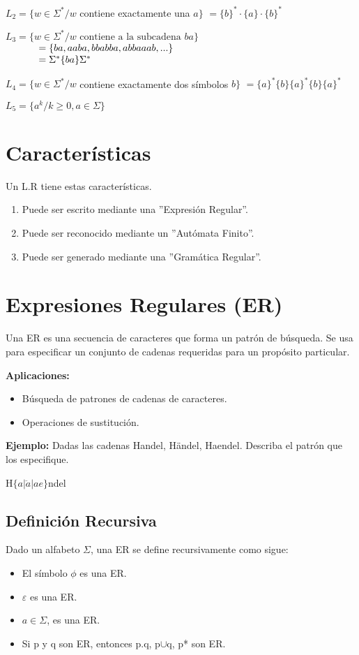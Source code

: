 $L_2=\{ w\in \Sigma^* / w$ contiene exactamente una $a\}$ $=\{b\}^* \cdot\{a\} \cdot\{ b\}^*$

$L_3=\{ w\in \Sigma^* / w \mbox{ contiene a la subcadena } ba\}$ \\
$\begin{array}{p{0.65cm}l}
   &=\{ ba,aaba,bbabba,abbaaab,...\} \\
   &=\Sigma^* \{ ba\}\Sigma^*
\end{array}$

$L_4=\{ w\in\Sigma^* / w$ contiene exactamente dos símbolos $b\}$ $=\{a\}^* \{b\}\{a\}^* \{b\}\{a\}^*$

$L_5=\{a^k /k \geq 0, a\in\Sigma \}$


\section{Características}
Un L.R tiene estas características.
\begin{enumerate}
\item Puede ser escrito mediante una ''Expresión Regular''.
\item Puede ser reconocido mediante un ''Autómata Finito''.
\item Puede ser generado mediante una ''Gramática Regular''.
\end{enumerate}

\section{Expresiones Regulares (ER)}
Una ER es una secuencia de caracteres que forma un patrón de búsqueda. Se usa para especificar un conjunto de cadenas requeridas para un propósito particular.

\textbf{Aplicaciones: }
\begin{itemize}
\item Búsqueda de patrones de cadenas de caracteres.
\item Operaciones de sustitución.
\end{itemize}

\textbf{Ejemplo: }Dadas las cadenas Handel, H\"andel, Haendel. Describa el patrón que los especifique.

H$\{a|\ddot{a}|ae\}$ndel

\subsection{Definición Recursiva}
Dado un alfabeto $\Sigma$, una ER se define recursivamente como sigue:
\begin{itemize}
\item El símbolo $\phi$ es una ER.
\item $\varepsilon$ es una ER.
\item $a\in\Sigma$, es una ER.
\item Si p y q son ER, entonces p.q, p$\cup$q, p* son ER.
\end{itemize}

